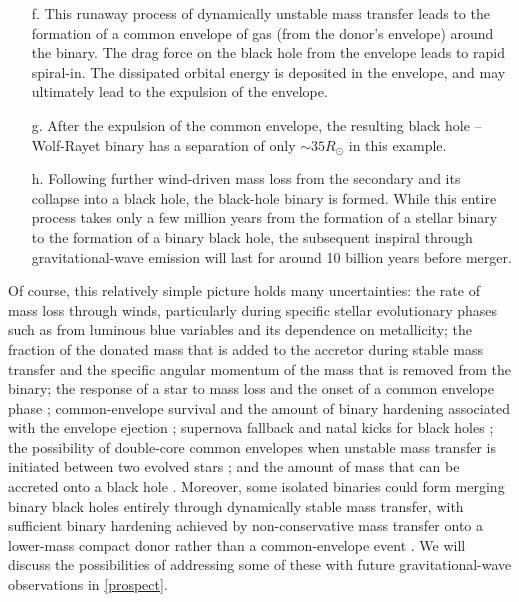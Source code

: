 \documentclass[review]{elsarticle}
\begin{document}
\begin{enumerate}
\item[f.] This runaway process of dynamically unstable mass transfer leads to the formation of a common envelope of gas (from the donor's envelope) around the binary.  The drag force on the black hole from the envelope leads to rapid spiral-in.   The dissipated orbital energy is deposited in the envelope, and may ultimately lead to the expulsion of the envelope.  
\item[g.] After the expulsion of the common envelope, the resulting black hole -- Wolf-Rayet binary has a separation of only $\sim 35 R_\odot$ in this example.  
\item[h.] Following further wind-driven mass loss from the secondary and its collapse into a black hole, the black-hole binary is formed.  While this entire process takes only a few million years from the formation of a stellar binary to the formation of a binary black hole, the subsequent inspiral through gravitational-wave emission will last for around 10 billion years before merger.
\end{enumerate}

Of course, this relatively simple picture holds many uncertainties: the rate of mass loss through winds, particularly during specific stellar evolutionary phases such as from luminous blue variables \citep[massive supergiant stars with significant outbursts and eruptions and associated rapid mass loss,][]{Mennekens:2014}  and its dependence on metallicity; the fraction of the donated mass that is added to the accretor during stable mass transfer \citep{KippenhahnMeyerHofmeister:1977} and the specific angular momentum of the mass that is removed from the binary; the response of a star to mass loss and the onset of a common envelope phase \citep{Pavlovskii:2017}; common-envelope survival and the amount of binary hardening associated with the envelope ejection \citep[e.g.,][]{Kruckow:2016,Klencki:2020convective,Fragos:2019,LawSmith:2020}; supernova fallback and natal kicks for black holes \citep[e.g.,][]{Fryer:2012,Repetto:2012,Mandel:2015kicks,Mueller:2020}; the possibility of double-core common envelopes when unstable mass transfer is initiated between two evolved stars \citep{BetheBrown:1998,Dewi:2006}; and the amount of mass that can be accreted onto a black hole \citep{Eldridge:2017,Bavera:2020,vanSon:2020}.  Moreover, some isolated binaries could form merging binary black holes entirely through dynamically stable mass transfer, with sufficient binary hardening achieved by non-conservative mass transfer onto a lower-mass compact donor rather than a common-envelope event \citep{vandenHeuvel:2017,Pavlovskii:2017,Neijssel:2018,vanSon:2021}.  We will discuss the possibilities of addressing some of these with future gravitational-wave observations in \autoref{prospect}.
\end{document}
